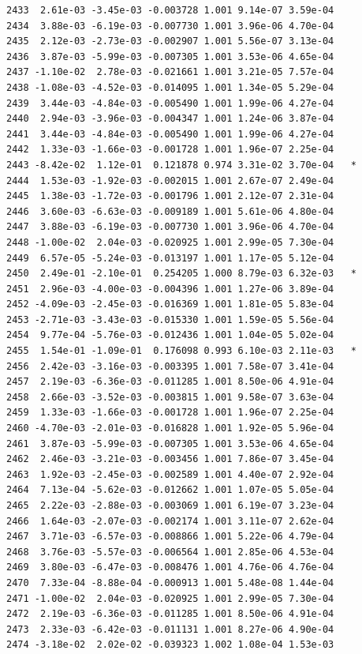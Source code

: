 \documentclass[
  letterpaper,
  DIV=11,
  numbers=noendperiod]{scrartcl}
\begin{document}
\begin{verbatim}
2433  2.61e-03 -3.45e-03 -0.003728 1.001 9.14e-07 3.59e-04    
2434  3.88e-03 -6.19e-03 -0.007730 1.001 3.96e-06 4.70e-04    
2435  2.12e-03 -2.73e-03 -0.002907 1.001 5.56e-07 3.13e-04    
2436  3.87e-03 -5.99e-03 -0.007305 1.001 3.53e-06 4.65e-04    
2437 -1.10e-02  2.78e-03 -0.021661 1.001 3.21e-05 7.57e-04    
2438 -1.08e-03 -4.52e-03 -0.014095 1.001 1.34e-05 5.29e-04    
2439  3.44e-03 -4.84e-03 -0.005490 1.001 1.99e-06 4.27e-04    
2440  2.94e-03 -3.96e-03 -0.004347 1.001 1.24e-06 3.87e-04    
2441  3.44e-03 -4.84e-03 -0.005490 1.001 1.99e-06 4.27e-04    
2442  1.33e-03 -1.66e-03 -0.001728 1.001 1.96e-07 2.25e-04    
2443 -8.42e-02  1.12e-01  0.121878 0.974 3.31e-02 3.70e-04   *
2444  1.53e-03 -1.92e-03 -0.002015 1.001 2.67e-07 2.49e-04    
2445  1.38e-03 -1.72e-03 -0.001796 1.001 2.12e-07 2.31e-04    
2446  3.60e-03 -6.63e-03 -0.009189 1.001 5.61e-06 4.80e-04    
2447  3.88e-03 -6.19e-03 -0.007730 1.001 3.96e-06 4.70e-04    
2448 -1.00e-02  2.04e-03 -0.020925 1.001 2.99e-05 7.30e-04    
2449  6.57e-05 -5.24e-03 -0.013197 1.001 1.17e-05 5.12e-04    
2450  2.49e-01 -2.10e-01  0.254205 1.000 8.79e-03 6.32e-03   *
2451  2.96e-03 -4.00e-03 -0.004396 1.001 1.27e-06 3.89e-04    
2452 -4.09e-03 -2.45e-03 -0.016369 1.001 1.81e-05 5.83e-04    
2453 -2.71e-03 -3.43e-03 -0.015330 1.001 1.59e-05 5.56e-04    
2454  9.77e-04 -5.76e-03 -0.012436 1.001 1.04e-05 5.02e-04    
2455  1.54e-01 -1.09e-01  0.176098 0.993 6.10e-03 2.11e-03   *
2456  2.42e-03 -3.16e-03 -0.003395 1.001 7.58e-07 3.41e-04    
2457  2.19e-03 -6.36e-03 -0.011285 1.001 8.50e-06 4.91e-04    
2458  2.66e-03 -3.52e-03 -0.003815 1.001 9.58e-07 3.63e-04    
2459  1.33e-03 -1.66e-03 -0.001728 1.001 1.96e-07 2.25e-04    
2460 -4.70e-03 -2.01e-03 -0.016828 1.001 1.92e-05 5.96e-04    
2461  3.87e-03 -5.99e-03 -0.007305 1.001 3.53e-06 4.65e-04    
2462  2.46e-03 -3.21e-03 -0.003456 1.001 7.86e-07 3.45e-04    
2463  1.92e-03 -2.45e-03 -0.002589 1.001 4.40e-07 2.92e-04    
2464  7.13e-04 -5.62e-03 -0.012662 1.001 1.07e-05 5.05e-04    
2465  2.22e-03 -2.88e-03 -0.003069 1.001 6.19e-07 3.23e-04    
2466  1.64e-03 -2.07e-03 -0.002174 1.001 3.11e-07 2.62e-04    
2467  3.71e-03 -6.57e-03 -0.008866 1.001 5.22e-06 4.79e-04    
2468  3.76e-03 -5.57e-03 -0.006564 1.001 2.85e-06 4.53e-04    
2469  3.80e-03 -6.47e-03 -0.008476 1.001 4.76e-06 4.76e-04    
2470  7.33e-04 -8.88e-04 -0.000913 1.001 5.48e-08 1.44e-04    
2471 -1.00e-02  2.04e-03 -0.020925 1.001 2.99e-05 7.30e-04    
2472  2.19e-03 -6.36e-03 -0.011285 1.001 8.50e-06 4.91e-04    
2473  2.33e-03 -6.42e-03 -0.011131 1.001 8.27e-06 4.90e-04    
2474 -3.18e-02  2.02e-02 -0.039323 1.002 1.08e-04 1.53e-03    

\end{verbatim}
\end{document}
